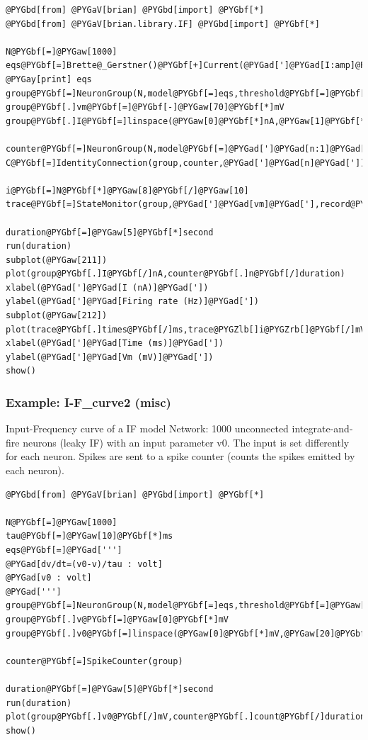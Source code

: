 \documentclass[letterpaper,10pt,english]{manual}
\begin{document}
\begin{Verbatim}[commandchars=@\[\]]
@PYGbd[from] @PYGaV[brian] @PYGbd[import] @PYGbf[*]
@PYGbd[from] @PYGaV[brian.library.IF] @PYGbd[import] @PYGbf[*]

N@PYGbf[=]@PYGaw[1000]
eqs@PYGbf[=]Brette@_Gerstner()@PYGbf[+]Current(@PYGad[']@PYGad[I:amp]@PYGad['])
@PYGay[print] eqs
group@PYGbf[=]NeuronGroup(N,model@PYGbf[=]eqs,threshold@PYGbf[=]@PYGbf[-]@PYGaw[20]@PYGbf[*]mV,reset@PYGbf[=]AdaptiveReset())
group@PYGbf[.]vm@PYGbf[=]@PYGbf[-]@PYGaw[70]@PYGbf[*]mV
group@PYGbf[.]I@PYGbf[=]linspace(@PYGaw[0]@PYGbf[*]nA,@PYGaw[1]@PYGbf[*]nA,N)

counter@PYGbf[=]NeuronGroup(N,model@PYGbf[=]@PYGad[']@PYGad[n:1]@PYGad['])
C@PYGbf[=]IdentityConnection(group,counter,@PYGad[']@PYGad[n]@PYGad['])

i@PYGbf[=]N@PYGbf[*]@PYGaw[8]@PYGbf[/]@PYGaw[10]
trace@PYGbf[=]StateMonitor(group,@PYGad[']@PYGad[vm]@PYGad['],record@PYGbf[=]i)

duration@PYGbf[=]@PYGaw[5]@PYGbf[*]second
run(duration)
subplot(@PYGaw[211])
plot(group@PYGbf[.]I@PYGbf[/]nA,counter@PYGbf[.]n@PYGbf[/]duration)
xlabel(@PYGad[']@PYGad[I (nA)]@PYGad['])
ylabel(@PYGad[']@PYGad[Firing rate (Hz)]@PYGad['])
subplot(@PYGaw[212])
plot(trace@PYGbf[.]times@PYGbf[/]ms,trace@PYGZlb[]i@PYGZrb[]@PYGbf[/]mV)
xlabel(@PYGad[']@PYGad[Time (ms)]@PYGad['])
ylabel(@PYGad[']@PYGad[Vm (mV)]@PYGad['])
show()
\end{Verbatim}

\resetcurrentobjects
\hypertarget{--doc-examples-misc_I-F_curve2}{}

\hypertarget{index-56}{}\subsubsection{Example: I-F\_curve2 (misc)}

Input-Frequency curve of a IF model
Network: 1000 unconnected integrate-and-fire neurons (leaky IF)
with an input parameter v0.
The input is set differently for each neuron.
Spikes are sent to a spike counter (counts the spikes emitted by each neuron).

\begin{Verbatim}[commandchars=@\[\]]
@PYGbd[from] @PYGaV[brian] @PYGbd[import] @PYGbf[*]

N@PYGbf[=]@PYGaw[1000]
tau@PYGbf[=]@PYGaw[10]@PYGbf[*]ms
eqs@PYGbf[=]@PYGad[''']
@PYGad[dv/dt=(v0-v)/tau : volt]
@PYGad[v0 : volt]
@PYGad[''']
group@PYGbf[=]NeuronGroup(N,model@PYGbf[=]eqs,threshold@PYGbf[=]@PYGaw[10]@PYGbf[*]mV,reset@PYGbf[=]@PYGaw[0]@PYGbf[*]mV,refractory@PYGbf[=]@PYGaw[5]@PYGbf[*]ms)
group@PYGbf[.]v@PYGbf[=]@PYGaw[0]@PYGbf[*]mV
group@PYGbf[.]v0@PYGbf[=]linspace(@PYGaw[0]@PYGbf[*]mV,@PYGaw[20]@PYGbf[*]mV,N)

counter@PYGbf[=]SpikeCounter(group)

duration@PYGbf[=]@PYGaw[5]@PYGbf[*]second
run(duration)
plot(group@PYGbf[.]v0@PYGbf[/]mV,counter@PYGbf[.]count@PYGbf[/]duration)
show()
\end{Verbatim}
\end{document}
